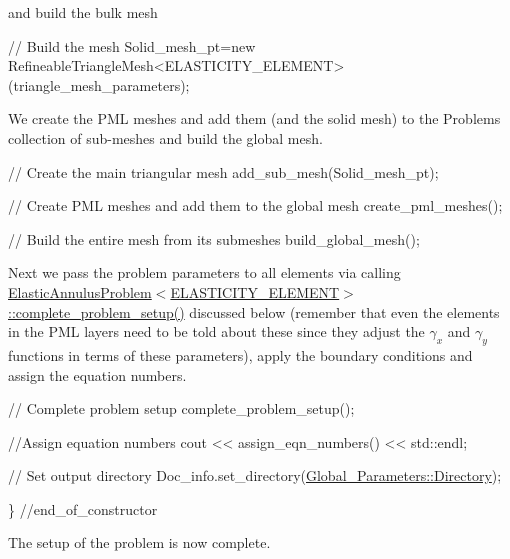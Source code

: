 and build the bulk mesh


\begin{DoxyCodeInclude}
 \textcolor{comment}{// Build the mesh}
 Solid\_mesh\_pt=\textcolor{keyword}{new} 
  RefineableTriangleMesh<ELASTICITY\_ELEMENT>(triangle\_mesh\_parameters);

\end{DoxyCodeInclude}


We create the P\+ML meshes and add them (and the solid mesh) to the Problem\textquotesingle{}s collection of sub-\/meshes and build the global mesh.


\begin{DoxyCodeInclude}
 \textcolor{comment}{// Create the main triangular mesh}
 add\_sub\_mesh(Solid\_mesh\_pt);

 \textcolor{comment}{// Create PML meshes and add them to the global mesh}
 create\_pml\_meshes();

 \textcolor{comment}{// Build the entire mesh from its submeshes}
 build\_global\_mesh();

\end{DoxyCodeInclude}


Next we pass the problem parameters to all elements via calling {\ttfamily  \hyperlink{classElasticAnnulusProblem_a06d509ff3316e5f3072ad5f9144cc33f}{Elastic\+Annulus\+Problem$<$\+E\+L\+A\+S\+T\+I\+C\+I\+T\+Y\+\_\+\+E\+L\+E\+M\+E\+N\+T$>$\+::complete\+\_\+problem\+\_\+setup()} } discussed below (remember that even the elements in the P\+ML layers need to be told about these since they adjust the $ \gamma_x $ and $ \gamma_y $ functions in terms of these parameters), apply the boundary conditions and assign the equation numbers.


\begin{DoxyCodeInclude}
 \textcolor{comment}{// Complete problem setup}
 complete\_problem\_setup();

 \textcolor{comment}{//Assign equation numbers}
 cout << assign\_eqn\_numbers() << std::endl; 

 \textcolor{comment}{// Set output directory}
 Doc\_info.set\_directory(\hyperlink{namespaceGlobal__Parameters_a301ab922df72030c660b21328d6caf76}{Global\_Parameters::Directory});

\} \textcolor{comment}{//end\_of\_constructor}

\end{DoxyCodeInclude}


The setup of the problem is now complete.




